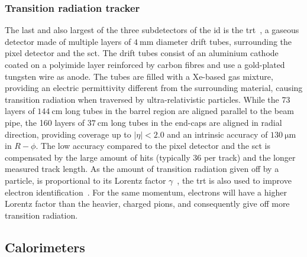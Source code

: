 \subsubsection{Transition radiation tracker}

The last and also largest of the three subdetectors of the \gls{id} is the \gls{trt}~\cite{Aad:2008zzm}, a gaseous detector made of multiple layers of $\SI{4}{\milli\meter}$ diameter drift tubes, surrounding the pixel detector and the \gls{sct}.
The drift tubes consist of an aluminium cathode coated on a polyimide layer reinforced by carbon fibres and use a gold-plated tungsten wire as anode.
The tubes are filled with a Xe-based gas mixture, providing an electric permittivity different from the surrounding material, causing transition radiation when traversed by ultra-relativistic particles.
While the 73 layers of $\SI{144}{\centi\meter}$ long tubes in the barrel region are aligned parallel to the beam pipe, the 160 layers of $\SI{37}{\centi\meter}$ long tubes in the end-caps are aligned in radial direction, providing coverage up to $\vert\eta\vert <2.0$ and an intrinsic accuracy of $\SI{130}{\micro\meter}$ in $R-\phi$.
The low accuracy compared to the pixel detector and the \gls{sct} is compensated by the large amount of hits (typically $36$ per track) and the longer measured track length.
As the amount of transition radiation given off by a particle, is proportional to its Lorentz factor $\gamma$~\cite{pdg2020}, the \gls{trt} is also used to improve electron identification~\cite{ATLAS-CONF-2011-128}.
For the same momentum, electrons will have a higher Lorentz factor than the heavier, charged pions, and consequently give off more transition radiation.

\subsection{Calorimeters}

